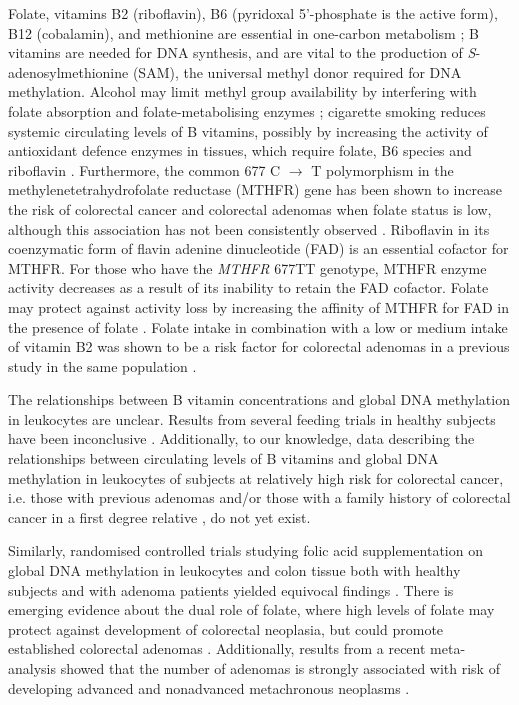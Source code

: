 \noindent Folate, vitamins B2 (riboflavin), B6 (pyridoxal 5'-phosphate is the active form), B12 (cobalamin), and methionine are essential in one-carbon metabolism \cite{c515}; B vitamins are needed for DNA synthesis, and are vital to the production of \emph{S}-adenosylmethionine (SAM), the universal methyl donor required for DNA methylation. Alcohol may limit methyl group availability by interfering with folate absorption and folate-metabolising enzymes \cite{c516}; cigarette smoking reduces systemic circulating levels of B vitamins, possibly by increasing the activity of antioxidant defence enzymes in tissues, which require folate, B6 species and riboflavin \cite{c517}. Furthermore, the common 677 C $\rightarrow$ T polymorphism in the methylenetetrahydrofolate reductase (MTHFR) gene has been shown to increase the risk of colorectal cancer \cite{c518} and colorectal adenomas \cite{c519} when folate status is low, although this association has not been consistently observed \cite{c520,c521,c522}. Riboflavin in its coenzymatic form of flavin adenine dinucleotide (FAD) is an essential cofactor for MTHFR. For those who have the \emph{MTHFR} 677TT genotype, MTHFR enzyme activity decreases as a result of its inability to retain the FAD cofactor. Folate may protect against activity loss by increasing the affinity of MTHFR for FAD in the presence of folate \cite{c523, c524}. Folate intake in combination with a low or medium intake of vitamin B2 was shown to be a risk factor for colorectal adenomas in a previous study in the same population \cite{c525}.

\noindent The relationships between B vitamin concentrations and global DNA methylation in leukocytes are unclear. Results from several feeding trials in healthy subjects have been inconclusive \cite{c526,c527,c528,c529}. Additionally, to our knowledge, data describing the relationships between circulating levels of B vitamins and global DNA methylation in leukocytes of subjects at relatively high risk for colorectal cancer, i.e. those with previous adenomas \cite{c530,c531} and/or those with a family history of colorectal cancer in a first degree relative \cite{c532}, do not yet exist.

\noindent Similarly, randomised controlled trials studying folic acid supplementation on global DNA methylation in leukocytes and colon tissue both with healthy subjects and with adenoma patients yielded equivocal findings \cite{c533,c534,c535,c536,c537,c538,c539,c540}. There is emerging evidence about the dual role of folate, where high levels of folate may protect against development of colorectal neoplasia, but could promote established colorectal adenomas \cite{c541,c542}. Additionally, results from a recent meta-analysis showed that the number of adenomas is strongly associated with risk of developing advanced and nonadvanced metachronous neoplasms \cite{c531}.

